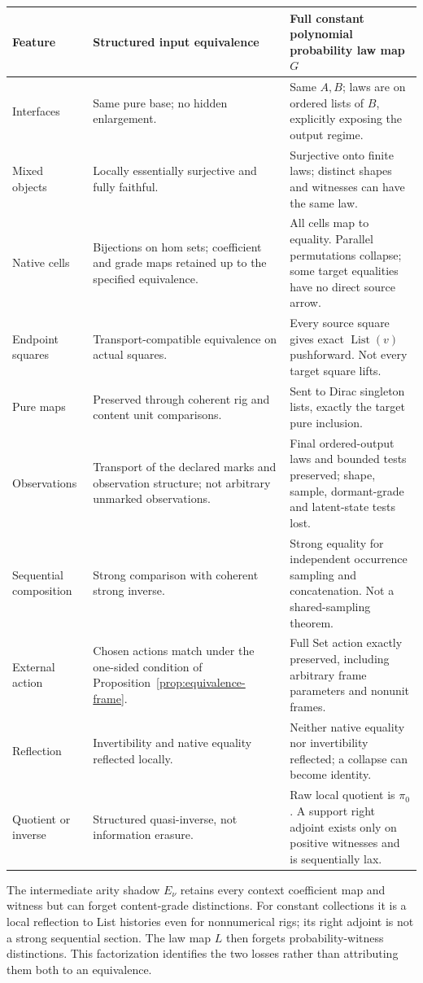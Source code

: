 \documentclass[11pt,a4paper]{article}
\theoremstyle{definition}
\newcommand{\List}{\operatorname{List}}
\begin{document}
\begin{longtable}{@{}p{.18\linewidth}p{.35\linewidth}p{.39\linewidth}@{}}
\toprule
Feature&Structured input equivalence&Full constant polynomial probability law map $G$\\
\midrule\endhead
Interfaces&Same pure base; no hidden enlargement.&Same $A,B$; laws are on
ordered lists of $B$, explicitly exposing the output regime.\\
Mixed objects&Locally essentially surjective and fully faithful.&Surjective
onto finite laws; distinct shapes and witnesses can have the same law.\\
Native cells&Bijections on hom sets; coefficient and grade maps retained
up to the specified equivalence.&All cells map to equality. Parallel
permutations collapse; some target equalities have no direct source arrow.\\
Endpoint squares&Transport-compatible equivalence on actual squares.&Every
source square gives exact $\List(v)$ pushforward. Not every target square
lifts.\\
Pure maps&Preserved through coherent rig and content unit comparisons.&Sent
to Dirac singleton lists, exactly the target pure inclusion.\\
Observations&Transport of the declared marks and observation structure;
not arbitrary unmarked observations.&Final ordered-output laws and bounded
tests preserved; shape, sample, dormant-grade and latent-state tests lost.\\
Sequential composition&Strong comparison with coherent strong inverse.&Strong
equality for independent occurrence sampling and concatenation. Not a
shared-sampling theorem.\\
External action&Chosen actions match under the one-sided condition of
Proposition~\ref{prop:equivalence-frame}.&Full Set action exactly preserved,
including arbitrary frame parameters and nonunit frames.\\
Reflection&Invertibility and native equality reflected locally.&Neither
native equality nor invertibility reflected; a collapse can become identity.\\
Quotient or inverse&Structured quasi-inverse, not information erasure.&Raw
local quotient is $\pi_0$. A support right adjoint exists only on positive
witnesses and is sequentially lax.\\
\bottomrule
\end{longtable}

The intermediate arity shadow $E_\nu$ retains every context coefficient map
and witness but can forget content-grade distinctions. For constant
collections it is a local reflection to List histories even for nonnumerical
rigs; its right adjoint is not a strong sequential section. The law map $L$
then forgets probability-witness distinctions. This factorization identifies
the two losses rather than attributing them both to an equivalence.
\end{document}
